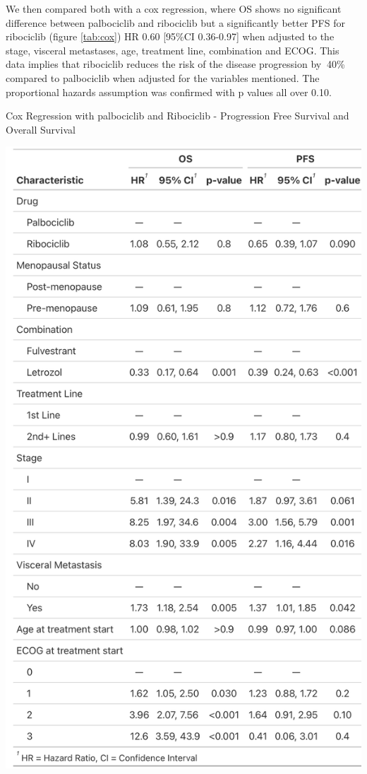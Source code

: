 We then compared both with a cox regression, where OS shows no significant difference between palbociclib and ribociclib but a significantly better PFS for ribociclib (figure \ref*{tab:cox}) HR 0.60 [95\%CI 0.36-0.97] when adjusted to the stage, visceral metastases, age, treatment line, combination and ECOG. This data implies that ribociclib reduces the risk of the disease progression by $~$40\% compared to palbociclib when adjusted for the variables mentioned. The proportional hazards assumption was confirmed with p values all over 0.10.
\begin{table}[ht]
  \centering
  \caption{Cox Regression with palbociclib and Ribociclib - Progression Free Survival and Overall Survival}\label{tab:cox} 
  \includegraphics[scale=0.20]{figures/cox_both.png}%

\end{table}

